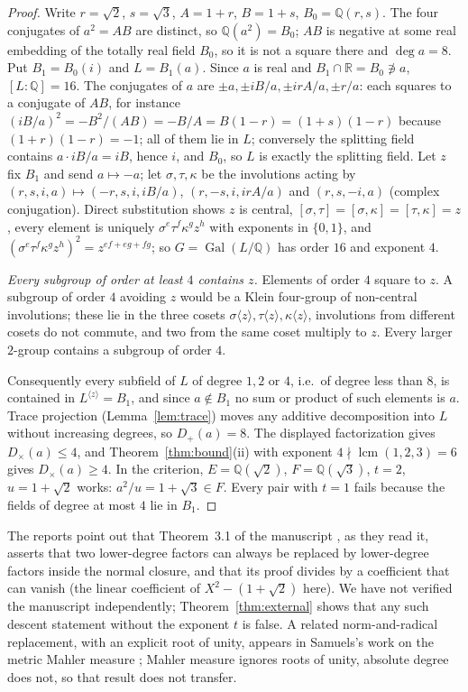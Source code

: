 \documentclass[11pt,a4paper]{article}
\theoremstyle{definition}
\theoremstyle{remark}
\newcommand{\Q}{\mathbb{Q}}
\newcommand{\R}{\mathbb{R}}
\newcommand{\Gal}{\operatorname{Gal}}
\newcommand{\lcm}{\operatorname{lcm}}
\newcommand{\dg}{\deg}
\newcommand{\Dp}{D_{+}}
\newcommand{\Dt}{D_{\times}}
\begin{document}
\begin{proof}
Write $r=\sqrt2$, $s=\sqrt3$, $A=1+r$, $B=1+s$, $B_0=\Q(r,s)$.  The four conjugates of $a^2=AB$ are
distinct, so $\Q(a^2)=B_0$; $AB$ is negative at some real embedding of the totally real field $B_0$,
so it is not a square there and $\dg a=8$.  Put $B_1=B_0(i)$ and $L=B_1(a)$.  Since $a$ is real and
$B_1\cap\R=B_0\not\ni a$, $[L:\Q]=16$.  The conjugates of $a$ are $\pm a,\pm iB/a,\pm irA/a,\pm r/a$: each squares to a conjugate of
$AB$, for instance $(iB/a)^2=-B^2/(AB)=-B/A=B(1-r)=(1+s)(1-r)$ because $(1+r)(1-r)=-1$; all of them
lie in $L$; conversely the splitting field contains $a\cdot iB/a=iB$, hence $i$, and $B_0$, so
$L$ is exactly the splitting field.  Let $z$ fix $B_1$ and send $a\mapsto-a$; let $\sigma,\tau,\kappa$
be the involutions acting by $(r,s,i,a)\mapsto(-r,s,i,iB/a)$, $(r,-s,i,irA/a)$ and $(r,s,-i,a)$ (complex
conjugation).  Direct substitution shows $z$ is central, $[\sigma,\tau]=[\sigma,\kappa]=[\tau,\kappa]=z$,
every element is uniquely $\sigma^e\tau^f\kappa^gz^h$ with exponents in $\{0,1\}$, and
$(\sigma^e\tau^f\kappa^gz^h)^2=z^{ef+eg+fg}$; so $G=\Gal(L/\Q)$ has order $16$ and exponent $4$.

\emph{Every subgroup of order at least $4$ contains $z$.}  Elements of order $4$ square to $z$.  A
subgroup of order $4$ avoiding $z$ would be a Klein four-group of non-central involutions; these lie in
the three cosets $\sigma\langle z\rangle,\tau\langle z\rangle,\kappa\langle z\rangle$, involutions from
different cosets do not commute, and two from the same coset multiply to $z$.  Every larger $2$-group
contains a subgroup of order $4$.

Consequently every subfield of $L$ of degree $1,2$ or $4$, i.e.\ of degree less than $8$, is contained
in $L^{\langle z\rangle}=B_1$, and since $a\notin B_1$ no sum or product of such elements is $a$.  Trace
projection (Lemma~\ref{lem:trace}) moves any additive decomposition into $L$ without increasing
degrees, so $\Dp(a)=8$.  The displayed factorization gives $\Dt(a)\le4$, and Theorem~\ref{thm:bound}(ii)
with exponent $4\nmid\lcm(1,2,3)=6$ gives $\Dt(a)\ge4$.  In the criterion, $E=\Q(\sqrt2)$,
$F=\Q(\sqrt3)$, $t=2$, $u=1+\sqrt2$ works: $a^2/u=1+\sqrt3\in F$.  Every pair with $t=1$ fails because
the fields of degree at most $4$ lie in $B_1$.
\end{proof}

The reports \cite{r1,r3,r7} point out that Theorem~3.1 of the manuscript \cite{Altamirano}, as they
read it, asserts that two lower-degree factors can always be replaced by lower-degree factors inside
the normal closure, and that its proof divides by a coefficient that can vanish (the linear coefficient
of $X^2-(1+\sqrt2)$ here).  We have not verified the manuscript independently; Theorem~\ref{thm:external}
shows that any such descent statement without the exponent $t$ is false.  A related norm-and-radical
replacement, with an explicit root of unity, appears in Samuels's work on the metric Mahler measure
\cite{Samuels}; Mahler measure ignores roots of unity, absolute degree does not, so that result does not
transfer.
\end{document}

